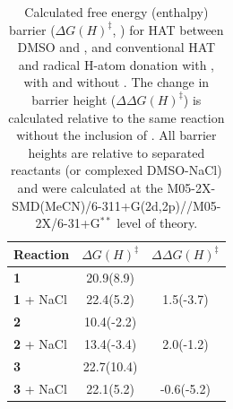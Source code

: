 \begin{table}[!htbp]
\caption[Calculated free energy (enthalpy) barrier for HAT between DMSO and
\cumo, and conventional HAT and radical H-atom donation with \bno, with and
without .]{Calculated free energy (enthalpy) barrier ($\Delta
G(H)^\ddagger$, \kcalmol) for HAT between DMSO and \cumo, and conventional HAT
and radical H-atom donation with \bno, with and without . The change in
barrier height ($\Delta \Delta G(H)^\ddagger$) is calculated relative to the
same reaction without the inclusion of . All barrier heights are
relative to separated reactants (or complexed DMSO-NaCl) and were calculated at
the M05-2X-SMD(MeCN)/6-311+G(2d,2p)//M05-2X/6-31+G$^{**}$ level of theory.}
\label{tab:dmso-dG}
\begin{tabular}{l c c}
Reaction    &  $\Delta G(H)^\ddagger$ &  $\Delta \Delta G(H)^\ddagger$ \\
\hline
\textbf{1}  & 20.9(8.9)  &              \\
\textbf{1} + NaCl & 22.4(5.2)  &  1.5(-3.7)   \\
\textbf{2}    & 10.4(-2.2) &              \\
\textbf{2} + NaCl & 13.4(-3.4) &  2.0(-1.2) \\
\textbf{3} & 22.7(10.4) &                  \\
\textbf{3} + NaCl & 22.1(5.2) & -0.6(-5.2)
\end{tabular}
\end{table}

